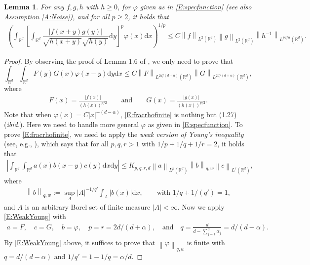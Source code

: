 \documentclass[12pt]{report}
\theoremstyle{plain}
\newtheorem{lemma}[theorem]{Lemma}
\theoremstyle{definition}
\numberwithin{equation}{section}
\newcommand{\R}{\mathbb{R}}
\newcommand{\Norm}[1]{\left\|  #1   \right\|}
\newcommand{\ud}{\ensuremath{ \mathrm{d} }}
\begin{document}
\begin{lemma} \label{L:rhofinite}
	For any $f,g,h$ with $h\ge0$, for $\varphi$ given as in \eqref{E:specfunction} (see also Assumption
	\ref{A:Noise}), and for all $p\ge 2$, it holds that
	\begin{align*}
	\left( \int_{\R^d} \left[ \int_{\R^d} \dfrac{|f(x+y)g(y)|}{\sqrt{h(x+y)}\sqrt{h(y)}} \ud y \right]^p \varphi(x) \ud x \right)^{1/p}
	\le C \Norm{f}_{L^2(\R^d)} \Norm{g}_{L^2(\R^d)} \Norm{h^{-1}}_{L^{pd/\alpha}(\R^d)}.
	\end{align*}
\end{lemma}
\begin{proof}
	By observing the proof of Lemma 1.6 of \cite{bass.chen.ea:09:large}, we only need to prove that
	\begin{equation} \label{E:fracrhofinite}
	\int_{\R^d}\int_{\R^d} F(y)G(x)\varphi\left(x-y\right) \ud y \ud x
	\le C \Norm{F}_{L^{2d/(d+\alpha)}(\R^d)} \Norm{G}_{L^{2d/(d+\alpha)}(\R^d)},
	\end{equation}
	where
	\begin{align*}
	F(x) = \frac{|f(x)|}{(h(x))^{p/2}} \qquad \text{and} \qquad
	G(x) = \frac{|g(x)|}{(h(x))^{p/2}}.
	\end{align*}
	Note that when $\varphi(x)=C |x|^{-(d-\alpha)}$, \eqref{E:fracrhofinite} is nothing but (1.27)
	({\it ibid.}). Here we need to handle more general $\varphi$ as given in \eqref{E:specfunction}.
	To prove \eqref{E:fracrhofinite}, we need to apply the {\it weak version of Young's inequality}
	(see, e.g., \cite[eq. (7) on p. 107]{lieb.loss:97:analysis}), which says that for all  $p,q,r >1$ with $1/p +
	1/q + 1/r =2$, it holds that
	\begin{align} \label{E:WeakYoung}
	\left|  \int_{\R^d}\int_{\R^d}a(x)b(x-y)c(y) \ud x \ud y \right|
	\le K_{p,q,r,d} \Norm{a}_{L^p(\R^d)}\Norm{b}_{q,w}\Norm{c}_{L^r(\R^d)},
	\end{align}
	where
	\begin{align*}
	\Norm{b}_{q,w} := \sup_{A} |A|^{-1/q'} \int_A |b(x)| \ud x, \qquad
	\text{with $1/q + 1/(q')=1$},
	\end{align*}
	and $A$ is an arbitrary Borel set of finite measure $|A|<\infty$.
	Now we apply \eqref{E:WeakYoung} with
	\begin{align*}
	a = F, \quad
	c = G, \quad
	b = \varphi, \quad
	p = r=2d/(d+\alpha), \quad \text{and} \quad
	q = \frac{d}{d-\sum_{j=1}^d\alpha_j }
	= d/(d-\alpha).
	\end{align*}
	By \eqref{E:WeakYoung} above, it suffices to prove that $\Norm{\varphi}_{q,w}$ is
	finite with $q = d/(d-\alpha)$ and $1/q' = 1 - 1/q = \alpha/d$.  \bigskip
	

\end{proof}
\end{document}
